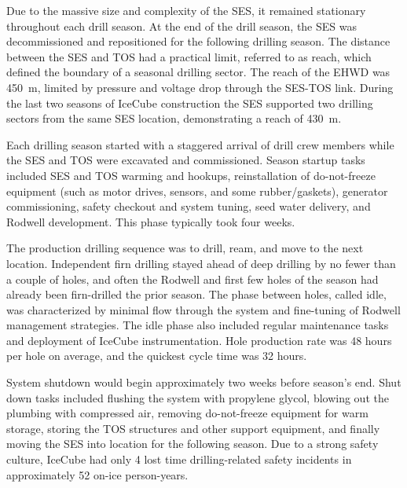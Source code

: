 Due to the massive size and complexity of the SES, it remained stationary throughout each drill season.  At the end of the drill season, the SES was decommissioned and repositioned for the following drilling season.  The distance between the SES and TOS had a practical limit, referred to as reach, which defined the boundary of a seasonal drilling sector.  The reach of the EHWD was 450~m, limited by pressure and voltage drop through the SES-TOS link.  During the last two seasons of IceCube construction the SES supported two drilling sectors from the same SES location, demonstrating a reach of 430~m.

Each drilling season started with a staggered arrival of drill crew members while the SES and TOS were excavated and commissioned.  Season startup tasks included SES and TOS warming and hookups, reinstallation of do-not-freeze equipment (such as motor drives, sensors, and some rubber/gaskets), generator commissioning, safety checkout and system tuning, seed water delivery, and Rodwell development.  This phase typically took four weeks.

The production drilling sequence was to drill, ream, and move to the next location.  Independent firn drilling stayed ahead of deep drilling by no fewer than a couple of holes, and often the Rodwell and first few holes of the season had already been firn-drilled the prior season.  The phase between holes, called idle, was characterized by minimal flow through the system and fine-tuning of Rodwell management strategies.  The idle phase also included regular maintenance tasks and deployment of IceCube instrumentation.  Hole production rate was 48 hours per hole on average, and the quickest cycle time was 32 hours.

System shutdown would begin approximately two weeks before season’s end.  Shut down tasks included flushing the system with propylene glycol, blowing out the plumbing with compressed air, removing do-not-freeze equipment for warm storage, storing the TOS structures and other support equipment, and finally moving the SES into location for the following season.
Due to a strong safety culture, IceCube had only 4 lost time drilling-related safety incidents in approximately 52 on-ice person-years.

\vspace{\baselineskip}


